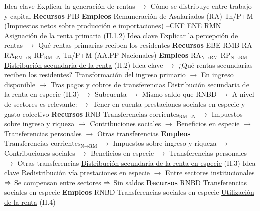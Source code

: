 \documentclass{nuevotema}
\begin{document}
\begin{esquemal}
				\4 Idea clave
				\4[] Explicar la generación de rentas
				\4[] $\to$ Cómo se distribuye entre trabajo y capital
				\4 \textbf{Recursos}
				\4[] PIB
				\4 \textbf{Empleos}
				\4[] Remuneración de Asalariados (RA)
				\4[] Tn/P+M (Impuestos netos sobre producción e importaciones)
				\4[] 
				\4[] 
				\4[] --CKF
				\4[] ENE
				\4[] RMN
			\3 \underline{Asignación de la renta primaria} (II.1.2)
				\4 Idea clave
				\4[] Explicar la percepción de rentas
				\4[] $\to$ Qué rentas primarias reciben los residentes
				\4 \textbf{Recursos}
				\4[] EBE
				\4[] RMB
				\4[] RA
				\4[] $\text{RA}_{\text{RM}\to \text{N}}$
				\4[] $\text{RP}_{\text{RM}\to \text{N}}$
				\4[] Tn/P+M (AA.PP Nacionales)
				\4 \textbf{Empleos}
				\4[] $\text{RA}_{\text{N} \to \text{RM}}$
				\4[] $\text{RP}_{\text{N} \to \text{RM}}$
				\4[] 
			\3 \underline{Distribución secundaria de la renta} (II.2)
				\4 Idea clave
				\4[] $\to$ ¿Qué rentas secundarias reciben los residentes?
				\4[] Transformación del ingreso primario
				\4[] $\to$ En ingreso disponible
				\4[] $\to$ Tras pagos y cobros de transferencias
				\4[] Distribución secundaria de la renta en especie (II.3)
				\4[] $\to$ Subcuenta
				\4[] $\to$ Mismo saldo que RNBD
				\4[] $\to$ A nivel de sectores es relevante:
				\4[] $\to$ Tener en cuenta prestaciones sociales en especie y gasto colectivo
				\4 \textbf{Recursos}
				\4[] RNB
				\4[] $\text{Transferencias corrientes}_{\text{RM} \to \text{N}}$
				\4[] $\to$ Impuestos sobre ingreso y riqueza
				\4[] $\to$ Contribuciones sociales
				\4[] $\to$ Beneficios en especie
				\4[] $\to$ Transferencias personales
				\4[] $\to$ Otras transferencias
				\4 \textbf{Empleos}
				\4[] $\text{Transferencias corrientes}_{\text{N} \to \text{RM}}$
				\4[] $\to$ Impuestos sobre ingreso y riqueza
				\4[] $\to$ Contribuciones sociales
				\4[] $\to$ Beneficios en especie
				\4[] $\to$ Transferencias personales
				\4[] $\to$ Otras transferencias
				\4[] 
			\3 \underline{Distribución secundaria de la renta en especie} (II.3)
				\4 Idea clave
				\4[] Redistribución vía prestaciones en especie
				\4[] $\to$ Entre sectores institucionales
				\4[] $\Rightarrow$ Se compensan entre sectores
				\4[] $\Rightarrow$ Sin saldos
				\4 \textbf{Recursos}
				\4[] RNBD
				\4[] Transferencias sociales en especie
				\4 \textbf{Empleos}
				\4[] RNBD
				\4[] Transferencias sociales en especie
			\3 \underline{Utilización de la renta} (II.4)

\end{esquemal}
\end{document}
